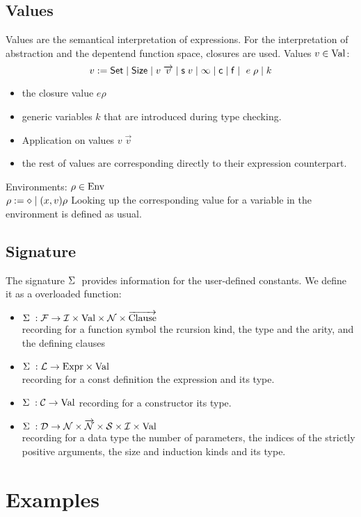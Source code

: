 \subsection{Values}
Values are the semantical interpretation of expressions.
For the interpretation of abstraction and the depentend function space, closures are used.
Values $ v \in \mathrm{Val}$:\\
\[v := \mathsf{Set} \;\vert\; \mathsf{Size} \;\vert\; v \; \overrightarrow{v} \;\vert\; \mathsf{s}\; v \;\vert\; \infty \;\vert\; \mathsf{c} \;\vert\; \mathsf{f} \;\vert\; \ e \; \rho \;\vert\; k\]
\begin{itemize}
\item
the closure value $e \rho $
\item
generic variables $k$ that are introduced during type checking.
\item
Application on values $ v \; \vec{v}$
\item
the rest of values are corresponding directly to their expression counterpart.
\end{itemize}
Environments: $ \rho \in \mathrm{Env}$ \\
$ \rho := \diamond \;\vert\; (x,v) \rho $
Looking up the corresponding value for a variable in the environment is defined as usual.
\subsection{Signature}

The signature $\Sigma\;$ provides information for the user-defined constants.
We define it as a overloaded function:
\begin{itemize}
\item
$ \Sigma\; : \mathcal{F} \rightarrow \mathcal{I} \times \mathrm{Val} \times \mathcal{N} \times \overrightarrow{\mathrm{Clause}}$\\
recording for a function symbol the rcursion kind, the type and the arity,
and the defining clauses
\item
$ \Sigma\; : \mathcal{L} \rightarrow \mathrm{Expr} \times \mathrm{Val} $ \\
recording for a const definition the expression and its type. 
\item
$ \Sigma\; : \mathcal{C} \rightarrow \mathrm{Val} $
recording for a constructor its type.
\item
$ \Sigma\; : \mathcal{D} \rightarrow \mathcal{N} \times \overrightarrow{\mathcal{N}} \times \mathcal{S} \times \mathcal{I} \times \mathrm{Val} $\\
recording for a data type the number of parameters, the indices of the strictly positive arguments,
the size and induction kinds and its type.
\end{itemize}



\section{Examples}
